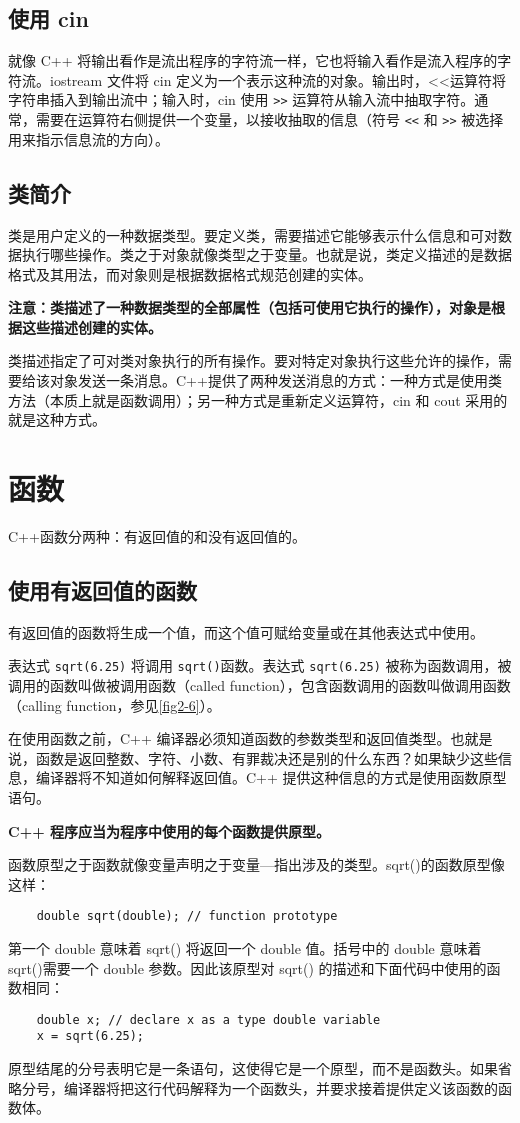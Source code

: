 \subsection{使用 cin}
就像 C++ 将输出看作是流出程序的字符流一样，它也将输入看作是流入程序的字符流。iostream 文件将 cin 定义为一个表示这种流的对象。输出时，<<运算符将字符串插入到输出流中；输入时，cin 使用 \verb|>>| 运算符从输入流中抽取字符。通常，需要在运算符右侧提供一个变量，以接收抽取的信息（符号 \verb|<<| 和 \verb|>>| 被选择用来指示信息流的方向）。
\subsection{类简介}
类是用户定义的一种数据类型。要定义类，需要描述它能够表示什么信息和可对数据执行哪些操作。类之于对象就像类型之于变量。也就是说，类定义描述的是数据格式及其用法，而对象则是根据数据格式规范创建的实体。

\textbf{注意：类描述了一种数据类型的全部属性（包括可使用它执行的操作），对象是根据这些描述创建的实体。}

类描述指定了可对类对象执行的所有操作。要对特定对象执行这些允许的操作，需要给该对象发送一条消息。C++提供了两种发送消息的方式：一种方式是使用类方法（本质上就是函数调用）；另一种方式是重新定义运算符，cin 和 cout 采用的就是这种方式。
\section{函数}
C++函数分两种：有返回值的和没有返回值的。
\subsection{使用有返回值的函数}
有返回值的函数将生成一个值，而这个值可赋给变量或在其他表达式中使用。

表达式 \verb|sqrt(6.25)| 将调用 \verb|sqrt()|函数。表达式 \verb|sqrt(6.25)| 被称为函数调用，被调用的函数叫做被调用函数（called function），包含函数调用的函数叫做调用函数（calling function，参见\autoref{fig2-6}）。

在使用函数之前，C++ 编译器必须知道函数的参数类型和返回值类型。也就是说，函数是返回整数、字符、小数、有罪裁决还是别的什么东西？如果缺少这些信息，编译器将不知道如何解释返回值。C++ 提供这种信息的方式是使用函数原型语句。

\textbf{C++ 程序应当为程序中使用的每个函数提供原型。}

函数原型之于函数就像变量声明之于变量—指出涉及的类型。sqrt()的函数原型像这样：
\begin{verbatim}
    double sqrt(double); // function prototype
\end{verbatim}
第一个 double 意味着 sqrt() 将返回一个 double 值。括号中的 double 意味着sqrt()需要一个 double 参数。因此该原型对 sqrt() 的描述和下面代码中使用的函数相同：
\begin{verbatim}
    double x; // declare x as a type double variable
    x = sqrt(6.25);
\end{verbatim}
原型结尾的分号表明它是一条语句，这使得它是一个原型，而不是函数头。如果省略分号，编译器将把这行代码解释为一个函数头，并要求接着提供定义该函数的函数体。

